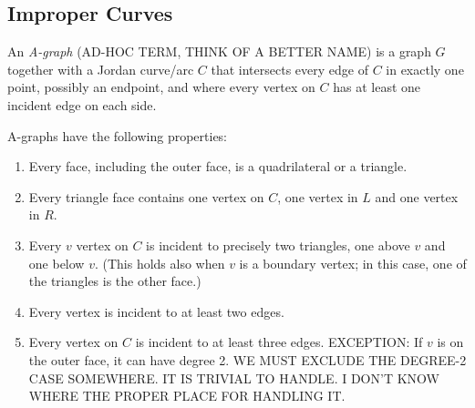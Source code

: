 \subsection{Improper Curves}

\begin{definition}
  An \emph{A-graph} (AD-HOC TERM, THINK OF A BETTER NAME)
is a graph $G$ together with a Jordan curve/arc $C$ that intersects
every edge of $C$ in exactly one point, possibly an endpoint,
and where every vertex on $C$ has at least one incident edge on each side.
\end{definition}

\begin{proposition}
\label  {a-graphs}
A-graphs have the following properties:
\begin{enumerate}
\item Every face, including the outer face, is a quadrilateral or a
  triangle.
\item Every triangle face contains one vertex on $C$, one vertex in
  $L$ and one vertex in $R$.
\item
\label{two-triangles}
  Every $v$ vertex on $C$ is incident to precisely two triangles,
  one 
above $v$ and one below $v$. (This holds also when $v$ is a boundary
vertex; in this case, one of the triangles is the other face.)
\item Every vertex is incident to at least two edges.
\item Every vertex on $C$ is incident to at least three edges.
EXCEPTION: If $v$ is on the outer face, it can have degree 2.
WE MUST EXCLUDE THE DEGREE-2 CASE SOMEWHERE. IT IS TRIVIAL TO HANDLE.
I DON'T KNOW WHERE THE PROPER PLACE FOR HANDLING IT.
\end{enumerate}
\end{proposition}

